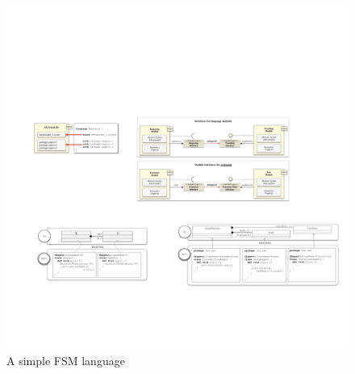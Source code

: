\begin{figure}
\centering
\includegraphics[width=1\linewidth]{images/k3-example-fig}
\caption{A simple FSM language}
\label{fig:k3-example}
\end{figure}

 
%    


